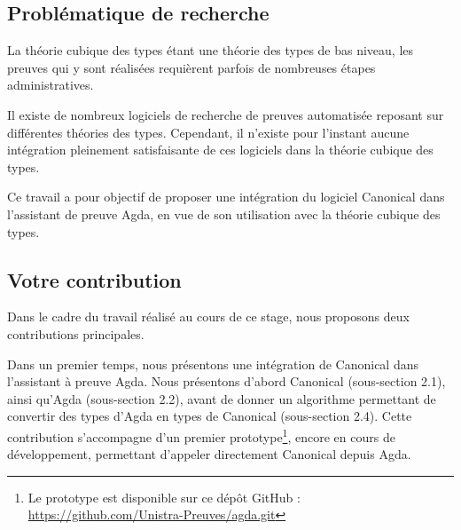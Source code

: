 \documentclass[11pt]{article}
\begin{document}


\subsection*{Problématique de recherche}
La théorie cubique des types\cite{cohen2016cubical} étant une théorie des types de bas niveau, 
les preuves qui y sont réalisées requièrent parfois de nombreuses étapes administratives.

Il existe de nombreux logiciels de recherche de preuves automatisée reposant sur différentes théories des types. 
Cependant, il n’existe pour l’instant aucune intégration pleinement satisfaisante de ces logiciels dans la théorie cubique des types.

Ce travail a pour objectif de proposer une intégration du logiciel Canonical dans l’assistant de preuve Agda, 
en vue de son utilisation avec la théorie cubique des types.



\subsection*{Votre contribution}
Dans le cadre du travail réalisé au cours de ce stage, nous proposons deux contributions principales.

Dans un premier temps, nous présentons une intégration de Canonical dans l’assistant à preuve Agda. 
Nous présentons d’abord Canonical (sous-section 2.1), ainsi qu’Agda (sous-section 2.2), 
avant de donner un algorithme permettant de convertir des types d’Agda en types de Canonical (sous-section 2.4). 
Cette contribution s’accompagne d’un premier prototype\footnote{Le prototype est disponible sur ce dépôt GitHub : \url{https://github.com/Unistra-Preuves/agda.git}}, 
encore en cours de développement, permettant d’appeler directement Canonical depuis Agda.
\end{document}
